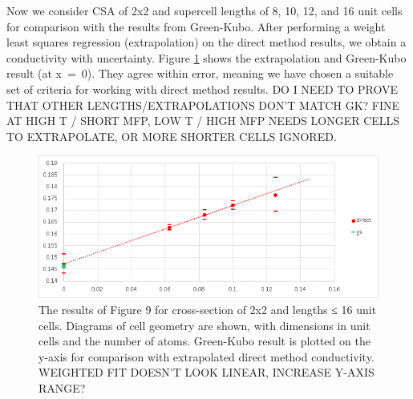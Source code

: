 \documentclass[%
preprint,                                  %
nofootinbib,
 amsmath,amssymb,
 aps,
]{revtex4-1}
\begin{document}
Now we consider CSA of 2x2 and supercell lengths of 8, 10, 12, and 16 unit cells for comparison with the results from Green-Kubo. After performing a weight least squares regression (extrapolation) on the direct method results, we obtain a conductivity with uncertainty. Figure \ref{fig:gk-direct} shows the extrapolation and Green-Kubo result (at x~=~0). They agree within error, meaning we have chosen a suitable set of criteria for working with direct method results. DO I NEED TO PROVE THAT OTHER LENGTHS/EXTRAPOLATIONS DON'T MATCH GK? FINE AT HIGH T / SHORT MFP, LOW T / HIGH MFP NEEDS LONGER CELLS TO EXTRAPOLATE, OR MORE SHORTER CELLS IGNORED.

\begin{figure}[h!]
  \includegraphics[width=\linewidth]{images/gk-direct-2.png}
  \caption{The results of Figure 9 for cross-section of 2x2 and lengths ≤ 16 unit cells. Diagrams of cell geometry are shown, with dimensions in unit cells and the number of atoms. Green-Kubo result is plotted on the y-axis for comparison with extrapolated direct method conductivity. WEIGHTED FIT DOESN'T LOOK LINEAR, INCREASE Y-AXIS RANGE?}
  \label{fig:gk-direct}
\end{figure}




\end{document}
